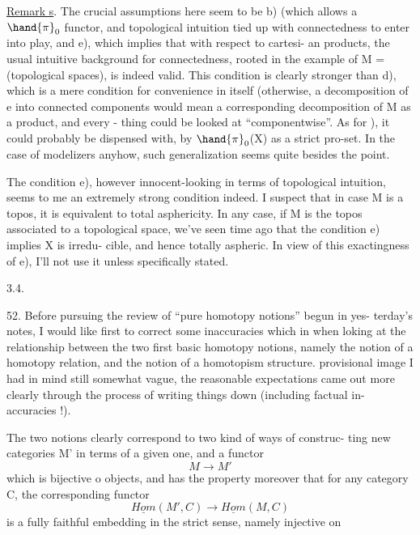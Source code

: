 
\uline{Remark s}. The crucial assumptions here seem to be b) (which allows 
 a $\hand{\pi}_0$ functor, and topological intuition tied up with connectedness
to enter into play\hand{)}, and e), which implies that with respect to cartesi-%
an products, the usual intuitive background for connectedness, rooted in
the example of M = (topological spaces), is indeed valid. This condition
is clearly stronger than d), which is a mere condition for convenience
in itself (otherwise, a decomposition of e into connected components
would mean a corresponding decomposition of M as a product, and every -%
thing could be looked at ``componentwise''\hand{)}. As for ), it could probably
be dispensed with, by  $\hand{\pi}_0$(X) as a strict pro-set. In the
case of modelizers anyhow, such generalization seems quite besides the
point.

The condition e), however innocent-looking in terms of topological
intuition, seems to me an extremely strong condition indeed. I suspect
that in case M is a topos, it is equivalent to total asphericity. In any
case, if M is the topos associated to a topological space, we've seen
time ago  that  the condition  e) implies X is irredu-%
cible, and hence totally aspheric. In view of this exactingness of e),
I'll not use it unless specifically stated.

3.4.

52. Before pursuing the review of ``pure homotopy notions'' begun in yes-%
terday's notes, I would like first to correct some inaccuracies which
 in when loking at the relationship between the two first basic
homotopy notions, namely the notion of a homotopy relation, and the 
notion of a homotopism structure.  
  provisional image I had in mind
 still somewhat vague,  the reasonable expectations came out more
clearly through the process of writing things down (including factual in-%
accuracies !).

The two notions clearly correspond to two kind of ways of construc-%
ting new categories M' in terms of a given one, and a functor
\[ M \longrightarrow M' \]
which is bijective o objects, and has the property moreover that for
any category C, the corresponding functor
\[ \underline{Hom}(M',C) \longrightarrow \underline{Hom}(M,C) \]
is a fully faithful embedding in the strict sense, namely injective on

